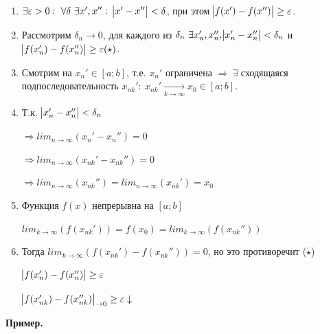 \documentclass{article}
\begin{document}
    \begin{enumerate}
        \item \(\exists \varepsilon > 0:\ \forall \delta\ \exists x', x'':\ \abs{x' - x''} < \delta\), при этом \(\abs{f(x')-f(x'')} \geq \varepsilon\).
        \item Рассмотрим \(\delta_n \rightarrow 0\), для каждого из \(\delta_n\ \exists x_n', x_n'', \abs{x_n' - x_n''} < \delta_n\) и \(\abs{f(x_n') - f(x_n'')} \geq \varepsilon(\star)\).
        \item Смотрим на \(x_n' \in [a; b]\), т.е. \(x_n'\) ограничена \(\Rightarrow\ \exists\) сходящаяся подпоследовательность \(x_{nk}':\ x_{nk}' \xrightarrow[k \rightarrow \infty]{} x_0 \in [a; b]\).
        \item Т.к. \( \abs{x_n' - x_n''} < \delta_n \)
        
        \( \Rightarrow lim_{n \to \infty}(x_n' - x_n'') = 0 \)

        \( \Rightarrow lim_{n \to \infty}(x_{nk}' - x_{nk}'') = 0\)

        \( \Rightarrow lim_{n \to \infty}(x_{nk}'') = lim_{n \to \infty}(x_{nk}') = x_0\)
        \item Функция \(f(x)\) непрерывна на \([a; b]\)
        
        \( lim_{k \to \infty}(f(x_{nk}')) = f(x_0) = lim_{k \to \infty}(f(x_{nk}'')) \)
        \item Тогда \( lim_{k \to \infty}(f(x_{nk}') - f(x_{nk}'')) = 0 \), но это противоречит (\(\star\))
        
        \( \abs{f(x_n') - f(x_n'')} \geq \varepsilon \)

        \( \abs{f(x_{nk}') - f(x_{nk}'')}_{\to 0} \geq \varepsilon \downarrow \)
    \end{enumerate}

    \textbf{Пример.}
\end{document}
